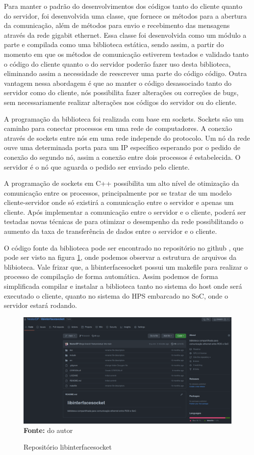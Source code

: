 Para manter o padrão do desenvolvimentos dos códigos tanto do cliente quanto do servidor, foi desenvolvida uma classe, que fornece os métodos para a abertura da comunicação, além de métodos para envio e recebimento das mensagens através da rede gigabit ethernet. Essa classe foi desenvolvida como um módulo a parte e compilada como uma biblioteca estática, sendo assim, a partir do momento em que os métodos de comunicação estiverem testados e validado tanto o código do cliente quanto o do servidor poderão fazer uso desta biblioteca, eliminando assim a necessidade de reescrever uma parte do código código. Outra vantagem nessa abordagem é que ao manter o código desassociado tanto do servidor como do cliente, nós possibilita fazer alterações ou correções de bugs, sem necessariamente realizar alterações nos códigos do servidor ou do cliente.

A programação da biblioteca foi realizada com base em sockets. Sockets são um caminho para conectar processos em uma rede de computadores. A conexão através de sockets entre nós em uma rede independe do protocolo. Um nó da rede ouve uma determinada porta para um IP específico esperando por o pedido de conexão do segundo nó, assim a conexão entre dois processos é estabelecida. O servidor é o nó que aguarda o pedido ser enviado pelo cliente.

A programação de sockets em C++ possibilita um alto nível de otimização da comunicação entre os processos, principalmente por se tratar de um modelo cliente-servidor onde só existirá a comunicação entre o servidor e apenas um cliente. Após implementar a comunicação entre o servidor e o cliente, poderá ser testadas novas técnicas de para otimizar o desempenho da rede possibilitando o aumento da taxa de transferência de dados entre o servidor e o cliente.

O código fonte da biblioteca pode ser encontrado no repositório no github \cite{Pereira-Neto-Biblioteca}, que pode ser visto na figura \ref{fig:gitlib}, onde podemos observar a estrutura de arquivos da blibioteca. Vale frizar que, a libinterfacesocket possui um makefile para realizar o processo de compilação de forma automática. Assim podemos de forma simplificada compilar e instalar a biblioteca tanto no sistema do host onde será executado o cliente, quanto no sistema do HPS embarcado no SoC, onde o servidor estará rodando. 

\begin{figure}[ht]
	\caption{Repositório libinterfacesocket}
	\begin{center}
		\includegraphics[scale=0.26]{imagens/git_libinterfacesocket.png}\\
		{\small \textbf{Fonte:} do autor}
    \end{center}
    \label{fig:gitlib}
\end{figure}
